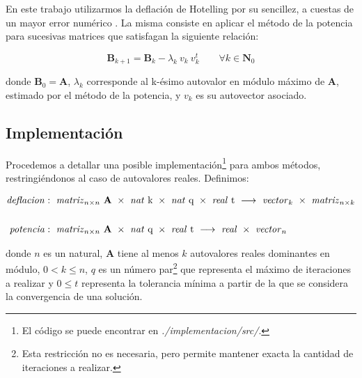 En este trabajo utilizarmos la deflación de Hotelling por su sencillez, a cuestas de un mayor error numérico \cite{Burden}. La misma consiste en aplicar el método de la potencia para sucesivas matrices que satisfagan la siguiente relación:

\vspace{1em}
\begin{equation} \label{deflacion}
    \mathbf{B}_{k+1} = \mathbf{B}_{k} - \lambda_k\ v_k\ v_k^t \qquad \forall k \in \mathbf{N}_0
\end{equation}

\vspace{2em}
\noindent donde $\mathbf{B}_0 = \mathbf{A}$, $\lambda_k$ corresponde al k-ésimo autovalor en módulo máximo de \textbf{A}, estimado por el método de la potencia, y $v_k$ es su autovector asociado.






\vspace{2em}
\subsection{Implementación} Procedemos a detallar una posible implementación\footnote{El código se puede encontrar en \textit{./implementacion/src/}.} para ambos métodos, restringiéndonos al caso de autovalores reales. Definimos:

\begin{align*}
    \text{\textit{deflacion}}&:\ \text{\textit{matriz}}_{n \times n}\ \mathbf{A}\ \times\ \text{\textit{nat} k}\ \times\ \text{\textit{nat} q}\ \times\ \text{\textit{real} t}\
    \longrightarrow\ \text{\textit{vector}}_k\ \times\ \text{\textit{matriz}}_{n \times k}
    \\ \\
    \text{\textit{potencia}}&:\ \text{\textit{matriz}}_{n \times n}\ \mathbf{A}\ \times\ \text{\textit{nat} q}\ \times\ \text{\textit{real} t}\ 
    \longrightarrow\ \text{\textit{real}}\ \times\ \text{\textit{vector}}_n
\end{align*}

\vspace{1em}
\noindent donde $n$ es un natural, \textbf{A} tiene al menos $k$ autovalores reales dominantes en módulo, $0 < k \leq n$, $q$ es un número par\footnote{Esta restricción no es necesaria, pero permite mantener exacta la cantidad de iteraciones a realizar.} que representa el máximo de iteraciones a realizar y $0 \leq t$ representa la tolerancia mínima a partir de la que se considera la convergencia de una solución. 

